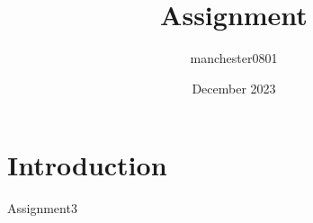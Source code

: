 \documentclass{article}
\title{Assignment}
\author{manchester0801 }
\date{December 2023}
\begin{document}
\maketitle

\section{Introduction}

Assignment3
\end{document}
